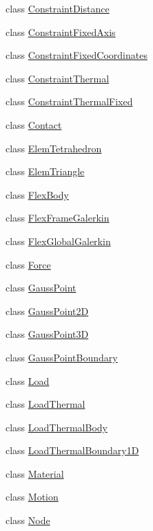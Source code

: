 \begin{DoxyCompactItemize}
class \hyperlink{classmknix_1_1_constraint_distance}{Constraint\+Distance}
\item 
class \hyperlink{classmknix_1_1_constraint_fixed_axis}{Constraint\+Fixed\+Axis}
\item 
class \hyperlink{classmknix_1_1_constraint_fixed_coordinates}{Constraint\+Fixed\+Coordinates}
\item 
class \hyperlink{classmknix_1_1_constraint_thermal}{Constraint\+Thermal}
\item 
class \hyperlink{classmknix_1_1_constraint_thermal_fixed}{Constraint\+Thermal\+Fixed}
\item 
class \hyperlink{classmknix_1_1_contact}{Contact}
\item 
class \hyperlink{classmknix_1_1_elem_tetrahedron}{Elem\+Tetrahedron}
\item 
class \hyperlink{classmknix_1_1_elem_triangle}{Elem\+Triangle}
\item 
class \hyperlink{classmknix_1_1_flex_body}{Flex\+Body}
\item 
class \hyperlink{classmknix_1_1_flex_frame_galerkin}{Flex\+Frame\+Galerkin}
\item 
class \hyperlink{classmknix_1_1_flex_global_galerkin}{Flex\+Global\+Galerkin}
\item 
class \hyperlink{classmknix_1_1_force}{Force}
\item 
class \hyperlink{classmknix_1_1_gauss_point}{Gauss\+Point}
\item 
class \hyperlink{classmknix_1_1_gauss_point2_d}{Gauss\+Point2\+D}
\item 
class \hyperlink{classmknix_1_1_gauss_point3_d}{Gauss\+Point3\+D}
\item 
class \hyperlink{classmknix_1_1_gauss_point_boundary}{Gauss\+Point\+Boundary}
\item 
class \hyperlink{classmknix_1_1_load}{Load}
\item 
class \hyperlink{classmknix_1_1_load_thermal}{Load\+Thermal}
\item 
class \hyperlink{classmknix_1_1_load_thermal_body}{Load\+Thermal\+Body}
\item 
class \hyperlink{classmknix_1_1_load_thermal_boundary1_d}{Load\+Thermal\+Boundary1\+D}
\item 
class \hyperlink{classmknix_1_1_material}{Material}
\item 
class \hyperlink{classmknix_1_1_motion}{Motion}
\item 
class \hyperlink{classmknix_1_1_node}{Node}
\item 

\end{DoxyCompactItemize}
